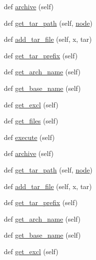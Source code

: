 \begin{DoxyCompactItemize}
def \hyperlink{classwaflib_1_1_scripting_1_1_dist_aaaa979f347096bd91a2feb553bbacf35}{archive} (self)
\item 
def \hyperlink{classwaflib_1_1_scripting_1_1_dist_a64707e5623688ede0aa955afe3640b98}{get\+\_\+tar\+\_\+path} (self, \hyperlink{structnode}{node})
\item 
def \hyperlink{classwaflib_1_1_scripting_1_1_dist_a2afba826ee8f5b522e6ce822f9878755}{add\+\_\+tar\+\_\+file} (self, x, tar)
\item 
def \hyperlink{classwaflib_1_1_scripting_1_1_dist_a20b28677d28b516c05e8af1b20c65c67}{get\+\_\+tar\+\_\+prefix} (self)
\item 
def \hyperlink{classwaflib_1_1_scripting_1_1_dist_a98d05f8f6a2fc8f33814fbc654135724}{get\+\_\+arch\+\_\+name} (self)
\item 
def \hyperlink{classwaflib_1_1_scripting_1_1_dist_aba6bf457f948f8ac80d1de9f47a59ac2}{get\+\_\+base\+\_\+name} (self)
\item 
def \hyperlink{classwaflib_1_1_scripting_1_1_dist_a1280a2469cad7d9fa88c3afcbbfa920d}{get\+\_\+excl} (self)
\item 
def \hyperlink{classwaflib_1_1_scripting_1_1_dist_afe6d98e6e39822f250f9302b07c0afab}{get\+\_\+files} (self)
\item 
def \hyperlink{classwaflib_1_1_scripting_1_1_dist_a1ed5e146ed66af4d02c205dbb428f49f}{execute} (self)
\item 
def \hyperlink{classwaflib_1_1_scripting_1_1_dist_aaaa979f347096bd91a2feb553bbacf35}{archive} (self)
\item 
def \hyperlink{classwaflib_1_1_scripting_1_1_dist_a64707e5623688ede0aa955afe3640b98}{get\+\_\+tar\+\_\+path} (self, \hyperlink{structnode}{node})
\item 
def \hyperlink{classwaflib_1_1_scripting_1_1_dist_a2afba826ee8f5b522e6ce822f9878755}{add\+\_\+tar\+\_\+file} (self, x, tar)
\item 
def \hyperlink{classwaflib_1_1_scripting_1_1_dist_a20b28677d28b516c05e8af1b20c65c67}{get\+\_\+tar\+\_\+prefix} (self)
\item 
def \hyperlink{classwaflib_1_1_scripting_1_1_dist_a98d05f8f6a2fc8f33814fbc654135724}{get\+\_\+arch\+\_\+name} (self)
\item 
def \hyperlink{classwaflib_1_1_scripting_1_1_dist_aba6bf457f948f8ac80d1de9f47a59ac2}{get\+\_\+base\+\_\+name} (self)
\item 
def \hyperlink{classwaflib_1_1_scripting_1_1_dist_a1280a2469cad7d9fa88c3afcbbfa920d}{get\+\_\+excl} (self)
\item 

\end{DoxyCompactItemize}
